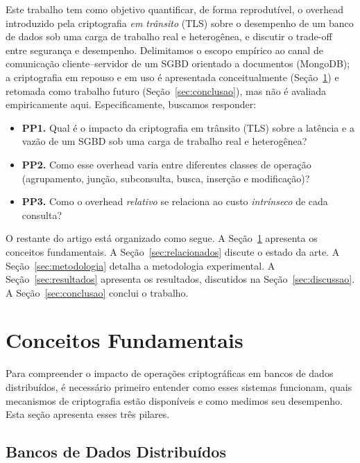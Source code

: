 \documentclass[12pt]{article}
\begin{document}
Este trabalho tem como objetivo quantificar, de forma reprodutível, o overhead
introduzido pela criptografia \emph{em trânsito} (TLS) sobre o desempenho de um
banco de dados sob uma carga de trabalho real e heterogênea, e discutir o
trade-off entre segurança e desempenho. Delimitamos o escopo empírico ao canal
de comunicação cliente--servidor de um SGBD orientado a documentos (MongoDB); a
criptografia em repouso e em uso é apresentada conceitualmente
(Seção~\ref{sec:conceitos}) e retomada como trabalho futuro
(Seção~\ref{sec:conclusao}), mas não é avaliada empiricamente aqui.
Especificamente, buscamos responder:
\begin{itemize}
  \item \textbf{PP1.} Qual é o impacto da criptografia em trânsito (TLS) sobre a
        latência e a vazão de um SGBD sob uma carga de trabalho real e
        heterogênea?
  \item \textbf{PP2.} Como esse overhead varia entre diferentes classes de
        operação (agrupamento, junção, subconsulta, busca, inserção e
        modificação)?
  \item \textbf{PP3.} Como o overhead \emph{relativo} se relaciona ao custo
        \emph{intrínseco} de cada consulta?
\end{itemize}

O restante do artigo está organizado como segue. A
Seção~\ref{sec:conceitos} apresenta os conceitos fundamentais. A
Seção~\ref{sec:relacionados} discute o estado da arte. A
Seção~\ref{sec:metodologia} detalha a metodologia experimental. A
Seção~\ref{sec:resultados} apresenta os resultados, discutidos na
Seção~\ref{sec:discussao}. A Seção~\ref{sec:conclusao} conclui o trabalho.


\section{Conceitos Fundamentais}
\label{sec:conceitos}

Para compreender o impacto de operações criptográficas em bancos de dados
distribuídos, é necessário primeiro entender como esses sistemas funcionam,
quais mecanismos de criptografia estão disponíveis e como medimos seu
desempenho. Esta seção apresenta esses três pilares.

\subsection{Bancos de Dados Distribuídos}
\label{sec:conc-bdd}
\end{document}
